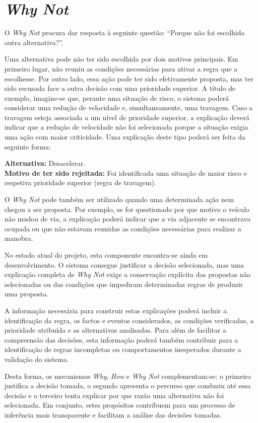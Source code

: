 \section{\emph{Why Not}}
\label{sec:whynot}

O \emph{Why Not} procura dar resposta à seguinte questão: \enquote{Porque não foi
escolhida outra alternativa?}.

Uma alternativa pode não ter sido escolhida por dois motivos principais. Em
primeiro lugar, não reuniu as condições necessárias para ativar a regra que a
escolhesse. Por outro lado, essa ação pode ter sido efetivamente proposta,
mas ter sido recusada face a outra decisão com uma prioridade superior. A
título de exemplo, imagine-se que, perante uma situação de risco, o sistema
poderá considerar uma redução de velocidade e, simultaneamente, uma travagem.
Caso a travagem esteja associada a um nível de prioridade superior, a
explicação deverá indicar que a redução de velocidade não foi selecionada
porque a situação exigia uma ação com maior criticidade. Uma explicação deste
tipo poderá ser feita da seguinte forma:

\begin{tcolorbox}[enhanced, colback=corFundo, colframe=corEscura,
    boxrule=0pt, leftrule=1.2pt, arc=0pt, outer arc=0pt,
    left=8pt, right=8pt, top=4pt, bottom=4pt, fontupper=\small]
  \textbf{Alternativa:} Desacelerar.\\
  \textbf{Motivo de ter sido rejeitada:} Foi identificada uma situação de
  maior risco e respetiva prioridade superior (regra de travagem).
\end{tcolorbox}

O \emph{Why Not} pode também ser utilizado quando uma determinada ação nem
chegou a ser proposta. Por exemplo, se for questionado por que motivo o
veículo não mudou de via, a explicação poderá indicar que a via adjacente se
encontrava ocupada ou que não estavam reunidas as condições necessárias para
realizar a manobra.

No estado atual do projeto, esta componente encontra-se ainda em
desenvolvimento. O sistema consegue justificar a decisão selecionada, mas uma
explicação completa de \emph{Why Not} exige a conservação explícita das
propostas não selecionadas ou das condições que impediram determinadas regras
de produzir uma proposta.

A informação necessária para construir estas explicações poderá incluir a
identificação da regra, os factos e eventos considerados, as condições
verificadas, a prioridade atribuída e as alternativas analisadas. Para além de
facilitar a compreensão das decisões, esta informação poderá também
contribuir para a identificação de regras incompletas ou comportamentos
inesperados durante a validação do sistema.

Desta forma, os mecanismos \emph{Why}, \emph{How} e \emph{Why Not}
complementam-se: o primeiro justifica a decisão tomada, o segundo apresenta o
percurso que conduziu até essa decisão e o terceiro tenta explicar por que
razão uma alternativa não foi selecionada. Em conjunto, estes propósitos
contribuem para um processo de inferência mais transparente e facilitam a
análise das decisões tomadas.
